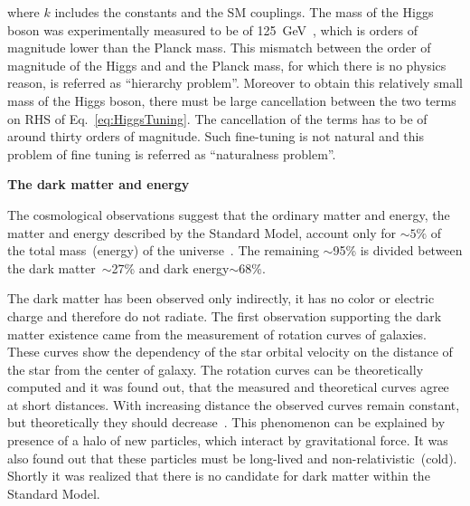 where $k$ includes the constants and the SM couplings. The mass of the Higgs boson was experimentally measured to be of 125~GeV~\cite{Chatrchyan:2012xdj, Aad:2012tfa}, which is orders of magnitude lower than the Planck mass. This mismatch between the order of magnitude of the Higgs and and the Planck mass, for which there is no physics reason, is referred as ``hierarchy problem''. Moreover to obtain this relatively small mass of the Higgs boson, there must be large cancellation between the two terms on RHS of Eq.~\ref{eq:HiggsTuning}. The cancellation of the terms has to be of around thirty orders of magnitude. Such fine-tuning is not natural and this problem of fine tuning is referred as ``naturalness problem''.


\textbf{The dark matter and energy}

The cosmological observations suggest that the ordinary matter and energy, the matter and energy described by the Standard Model, account only for $\sim 5\%$ of the total mass~(energy) of the universe~\cite{Bertone:2004pz, Gaitskell:2004gd, Bennett:2012zja}. The remaining $\sim$95\% is divided between the dark matter~$\sim$27\% and dark energy$\sim$68\%.

The dark matter has been observed only indirectly, it has no color or electric charge and therefore do not radiate. The first observation supporting the dark matter existence came from the measurement of rotation curves of galaxies. These curves show the dependency of the star orbital velocity on the distance of the star from the center of galaxy. The rotation curves can be theoretically computed and it was found out, that the measured and theoretical curves agree at short distances. With increasing distance the observed curves remain constant, but theoretically they should decrease~\cite{Bertone:2004pz}. This phenomenon can be explained by presence of a halo of new particles, which interact by gravitational force. It was also found out that these particles must be long-lived and non-relativistic~(cold). Shortly it was realized that there is no candidate for dark matter within the Standard Model.

